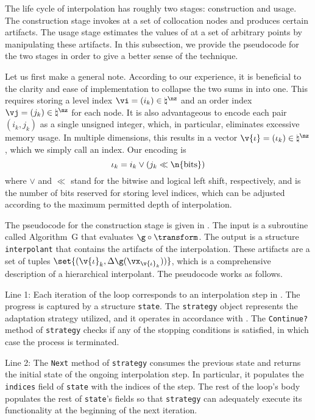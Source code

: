 The life cycle of interpolation has roughly two stages: construction and usage.
The construction stage invokes \g at a set of collocation nodes and produces
certain artifacts. The usage stage estimates the values of \g at a set of
arbitrary points by manipulating these artifacts. In this subsection, we provide
the pseudocode for the two stages in order to give a better sense of the
technique.

Let us first make a general note. According to our experience, it is beneficial
to the clarity and ease of implementation to collapse the two sums in
 into one. This requires storing a level index $\vi =
(i_k) \in \natural^\nz$ and an order index $\vj = (j_k) \in \natural^\nz$ for
each node. It is also advantageous to encode each pair $(i_k, j_k)$ as a single
unsigned integer, which, in particular, eliminates excessive memory usage. In
multiple dimensions, this results in a vector $\v{\iota} = (\iota_k) \in
\natural^\nz$, which we simply call an index. Our encoding is
\[
  \iota_k = i_k \lor (j_k \ll \n{\mathrm{bits}})
\]
where $\lor$ and $\ll$ stand for the bitwise  and logical left shift,
respectively, and  is the number of bits reserved for storing
level indices, which can be adjusted according to the maximum permitted depth of
interpolation.

The pseudocode for the construction stage is given in .
The input is a subroutine called Algorithm~G that evaluates $\g \circ
\transform$. The output is a structure \texttt{interpolant} that contains the
artifacts of the interpolation. These artifacts are a set of tuples
$\set{(\v{\iota}_k, \Delta\g(\vx_{\v{\iota}_k}))}$, which is a comprehensive
description of a hierarchical interpolant. The pseudocode works as follows.

Line 1: Each iteration of the loop corresponds to an interpolation step \ls in
. The progress is captured by a structure
\texttt{state}. The \texttt{strategy} object represents the adaptation strategy
utilized, and it operates in accordance with . The
\texttt{Continue?} method of \texttt{strategy} checks if any of the stopping
conditions is satisfied, in which case the process is terminated.

Line 2: The \texttt{Next} method of \texttt{strategy} consumes the previous
state and returns the initial state of the ongoing interpolation step. In
particular, it populates the \texttt{indices} field of \texttt{state} with the
indices of the step. The rest of the loop's body populates the rest of
\texttt{state}'s fields so that \texttt{strategy} can adequately execute its
functionality at the beginning of the next iteration.

